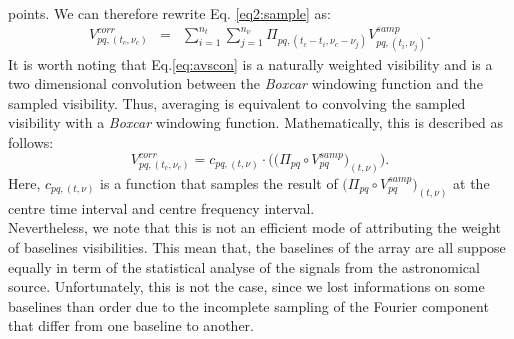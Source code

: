\documentclass[useAMS,usenatbib]{mn2e}
\begin{document}
points. We can therefore rewrite Eq. \ref{eq2:sample} as:
\begin{eqnarray}
V_{pq,(t_c,\nu_c)}^{corr}&=&\sum_{i=1}^{n_t}\sum_{j=1}^{n_{\nu}}\Pi_{pq,(t_c - t_i,\nu_c -\nu_j)}V_{pq,(t_i,\nu_j)}^{samp}. 
\label{eq:avscon}
\end{eqnarray}
It is worth noting that Eq.\ref{eq:avscon} is a naturally weighted visibility and is a two dimensional convolution between the 
\textit{Boxcar} windowing function and the sampled visibility. Thus, averaging is equivalent to convolving the 
sampled 
visibility with a \textit{Boxcar} windowing function. Mathematically, this is described as follows:
\begin{equation}
 V_{pq,(t_c,\nu_c)}^{corr}=c_{pq,(t,\nu)}\cdot\Bigg(\Big(\Pi_{pq}\circ V_{pq}^{samp}\Big)_{(t,\nu)}\Bigg). \label{f4}
\end{equation}
Here, $c_{pq,(t,\nu)}$ is a function that samples the result of $\Big(\Pi_{pq}\circ V_{pq}^{samp}\Big)_{(t,\nu)}$ at 
the centre time interval and centre frequency interval. \\%
Nevertheless, we note that this is not an efficient mode of attributing the weight of baselines visibilities. This mean that, the baselines 
of the array are all suppose equally in term of the statistical analyse of the signals from the astronomical source. Unfortunately, this 
is not the case, since we lost informations on some baselines than order due to the incomplete sampling of the Fourier component that 
differ from one baseline to another.
\end{document}
